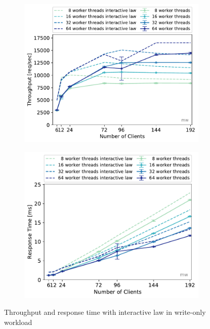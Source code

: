 \documentclass[11pt,a4paper]{article}
\begin{document}
\begin{figure}
	\begin{subfigure}[b]{.49\linewidth}
		\centering
		\includegraphics[width=\linewidth]{data/exp32_wo_tp_nc_w.pdf}
	\end{subfigure}\hfill
	\begin{subfigure}[b]{.49\linewidth}
		\centering
		\includegraphics[width=\linewidth]{data/exp32_wo_rt_nc_w.pdf}
	\end{subfigure}%
	\caption{Throughput and response time with interactive law in write-only workload}
\end{figure}
\end{document}
